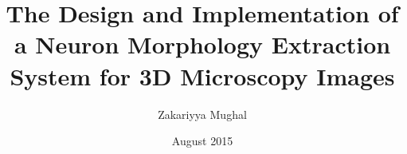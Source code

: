 \title{\bf \large The Design and Implementation of a Neuron
Morphology Extraction System for {3D} Microscopy Images}
\author{Zakariyya Mughal}
\date{August 2015}



